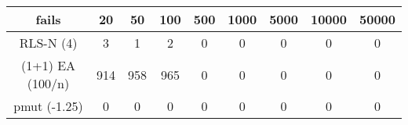 \begin{tabular}[h]{ccccccccc}
fails&20&50&100&500&1000&5000&10000&50000\\\hline
RLS-N (4)&3&1&2&0&0&0&0&0\\
(1+1) EA (100/n)&914&958&965&0&0&0&0&0\\
pmut (-1.25)&0&0&0&0&0&0&0&0\\
\end{tabular}
